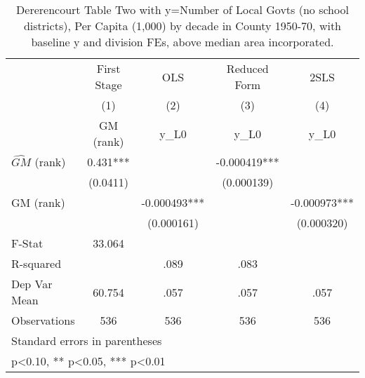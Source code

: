 \begin{table}[htbp]\centering
\def\sym#1{\ifmmode^{#1}\else\(^{#1}\)\fi}
\caption{Dererencourt Table Two with y=Number of Local Govts (no school districts), Per Capita (1,000) by decade in County 1950-70, with baseline y and division FEs, above median area incorporated.}
\begin{tabular}{l*{4}{c}}
\toprule
                    & First Stage   &         OLS   &Reduced Form   &        2SLS   \\
                    &\multicolumn{1}{c}{(1)}&\multicolumn{1}{c}{(2)}&\multicolumn{1}{c}{(3)}&\multicolumn{1}{c}{(4)}\\
                    &\multicolumn{1}{c}{GM  (rank)}&\multicolumn{1}{c}{y\_L0}&\multicolumn{1}{c}{y\_L0}&\multicolumn{1}{c}{y\_L0}\\
\midrule
$\hat{GM}$ (rank)   &       0.431***&               &   -0.000419***&               \\
                    &    (0.0411)   &               &  (0.000139)   &               \\
\addlinespace
GM  (rank)          &               &   -0.000493***&               &   -0.000973***\\
                    &               &  (0.000161)   &               &  (0.000320)   \\
\midrule
F-Stat              &      33.064   &               &               &               \\
R-squared           &               &        .089   &        .083   &               \\
Dep Var Mean        &      60.754   &        .057   &        .057   &        .057   \\
Observations        &         536   &         536   &         536   &         536   \\
\bottomrule
\multicolumn{5}{l}{\footnotesize Standard errors in parentheses}\\
\multicolumn{5}{l}{\footnotesize * p<0.10, ** p<0.05, *** p<0.01}\\
\end{tabular}
\end{table}
